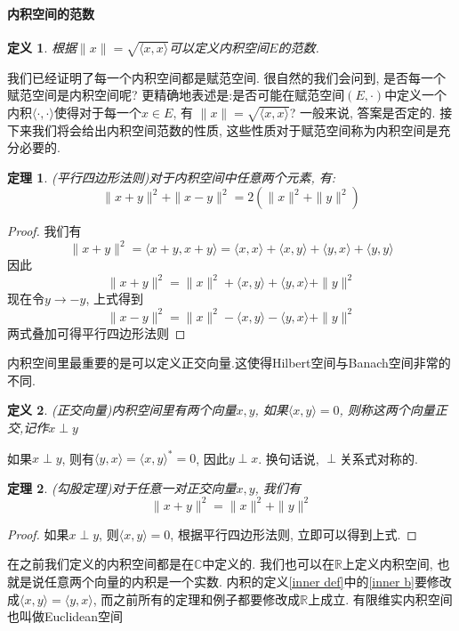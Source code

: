 \documentclass[a4paper,11pt]{article}
\newtheorem{definition}{\hspace{2em}定义}[section]
\newtheorem{theorem}{\hspace{2em}定理}[section]
\newtheorem{proof}{证明}[section]
\begin{document}
\paragraph*{内积空间的范数}
\begin{definition}
  根据$\|x\|=\sqrt{\langle x,x\rangle}$可以定义内积空间$E$的范数.
\end{definition}
我们已经证明了每一个内积空间都是赋范空间. 很自然的我们会问到, 是否每一个赋范空间是内积空间呢? 更精确地表述是:是否可能在赋范空间$(E,\cdot)$中定义一个内积$\langle\cdot,\cdot\rangle$使得对于每一个$x\in E$, 有 $\|x\|=\sqrt{\langle x,x\rangle}$? 一般来说, 答案是否定的. 接下来我们将会给出内积空间范数的性质, 这些性质对于赋范空间称为内积空间是充分必要的.
\begin{theorem}
  (平行四边形法则)对于内积空间中任意两个元素, 有:
  \begin{equation*}
    \|x+y\|^2+\|x-y\|^2=2(\|x\|^2+\|y\|^2)
  \end{equation*}
\end{theorem}
\begin{proof}
  我们有
  \begin{equation*}
    \|x+y\|^2=\langle x+y,x+y\rangle=\langle x,x\rangle+\langle x,y\rangle+\langle y,x\rangle+\langle y,y\rangle
  \end{equation*}
  因此
  \begin{equation*}
    \|x+y\|^2=\|x\|^2+\langle x,y\rangle+\langle y,x\rangle+\|y\|^2
  \end{equation*}
  现在令$y\to -y$, 上式得到
  \begin{equation*}
    \|x-y\|^2=\|x\|^2-\langle x,y\rangle-\langle y,x\rangle+\|y\|^2
  \end{equation*}
  两式叠加可得平行四边形法则
\end{proof}
内积空间里最重要的是可以定义正交向量.这使得Hilbert空间与Banach空间非常的不同.
\begin{definition}
  (正交向量)内积空间里有两个向量$x,y$, 如果$\langle x,y\rangle=0$, 则称这两个向量正交,记作$x\perp y$
\end{definition}
如果$x\perp y$, 则有$\langle y,x\rangle=\langle x,y\rangle^*=0$, 因此$y\perp x$. 换句话说, $\perp$关系式对称的.
\begin{theorem}
  (勾股定理)对于任意一对正交向量$x,y$, 我们有
  \begin{equation*}
    \|x+y\|^2=\|x\|^2+\|y\|^2
  \end{equation*}
\end{theorem}
\begin{proof}
  如果$x\perp y$, 则$\langle x,y\rangle=0$, 根据平行四边形法则, 立即可以得到上式.
\end{proof}
在之前我们定义的内积空间都是在$\mathbb{C}$中定义的. 我们也可以在$\mathbb{R}$上定义内积空间, 也就是说任意两个向量的内积是一个实数. 内积的定义\ref{inner def}中的\ref{inner b}要修改成$\langle x,y\rangle=\langle y,x\rangle$, 而之前所有的定理和例子都要修改成$\mathbb{R}$上成立. 有限维实内积空间也叫做Euclidean空间
\end{document}
